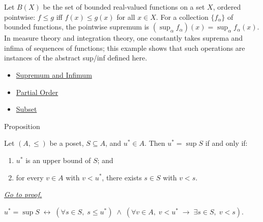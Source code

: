 \begin{remark*}[Exposition]
Let $B(X)$ be the set of bounded real-valued functions on a set $X$, ordered
pointwise: $f \leq g$ iff $f(x) \leq g(x)$ for all $x \in X$.  For a
collection $\{f_\alpha\}$ of bounded functions, the pointwise supremum is
$(\sup_\alpha f_\alpha)(x) = \sup_\alpha f_\alpha(x)$.  In measure theory and
integration theory, one constantly takes suprema and infima of sequences of
functions; this example shows that such operations are instances of the
abstract sup/inf defined here.
\end{remark*}

\begin{dependencies}
\begin{itemize}
  \item \hyperref[def:sup-inf]{Supremum and Infimum}
  \item \hyperref[def:partial-order]{Partial Order}
  \item \hyperref[def:subset]{Subset}
\end{itemize}
\end{dependencies}


\begin{propositionbox}{Proposition}
\begin{proposition}
\label{prop:sup-char}
Let $(A, \leq)$ be a poset, $S \subseteq A$, and $u^* \in A$.  Then
$u^* = \sup S$ if and only if:
\begin{enumerate}[label=(\roman*)]
  \item $u^*$ is an upper bound of $S$; and
  \item for every $v \in A$ with $v < u^*$, there exists $s \in S$ with
        $v < s$.
\end{enumerate}
\hyperref[prf:sup-char]{\textit{Go to proof.}}
\end{proposition}
\end{propositionbox}

\begin{remark*}
$u^* = \sup S \;\leftrightarrow\; (\forall s \in S,\; s \leq u^*) \;\wedge\;
(\forall v \in A,\; v < u^* \;\rightarrow\; \exists s \in S,\; v < s)$.
\end{remark*}

